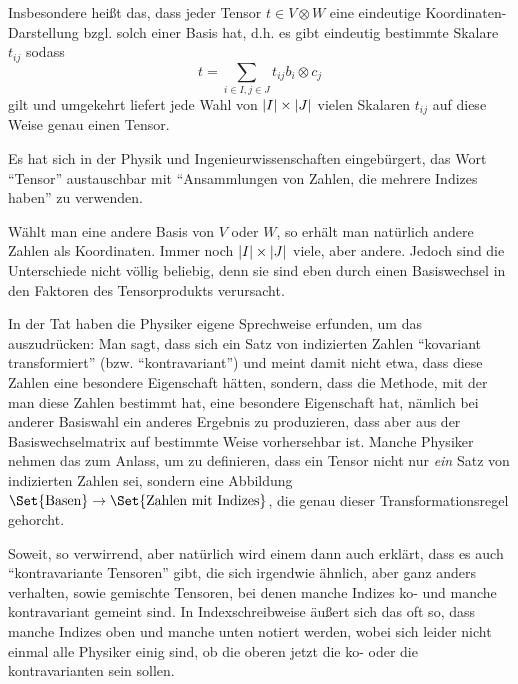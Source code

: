 \begin{remark}
Insbesondere heißt das, dass jeder Tensor $t\in V\otimes W$ eine eindeutige Koordinaten-Darstellung bzgl. solch einer Basis hat, d.h. es gibt eindeutig bestimmte Skalare $t_{ij}$ sodass
\[t = \sum_{i\in I, j\in J} t_{ij} b_i\otimes c_j\]
gilt und umgekehrt liefert jede Wahl von $\lvert I\rvert\times \lvert J\rvert$ vielen Skalaren $t_{ij}$ auf diese Weise genau einen Tensor.

Es hat sich in der Physik und Ingenieurwissenschaften eingebürgert, das Wort \enquote{Tensor} austauschbar mit \enquote{Ansammlungen von Zahlen, die mehrere Indizes haben} zu verwenden.

\medbreak
Wählt man eine andere Basis von $V$ oder $W$, so erhält man natürlich andere Zahlen als Koordinaten. Immer noch $\lvert I\rvert\times\lvert J\rvert$ viele, aber andere. Jedoch sind die Unterschiede nicht völlig beliebig, denn sie sind eben durch einen Basiswechsel in den Faktoren des Tensorprodukts verursacht.

In der Tat haben die Physiker eigene Sprechweise erfunden, um das auszudrücken: Man sagt, dass sich ein Satz von indizierten Zahlen \enquote{kovariant transformiert} (bzw. \enquote{kontravariant}) und meint damit nicht etwa, dass diese Zahlen eine besondere Eigenschaft hätten, sondern, dass die Methode, mit der man diese Zahlen bestimmt hat, eine besondere Eigenschaft hat, nämlich bei anderer Basiswahl ein anderes Ergebnis zu produzieren, dass aber aus der Basiswechselmatrix auf bestimmte Weise vorhersehbar ist. Manche Physiker nehmen das zum Anlass, um zu definieren, dass ein Tensor nicht nur \emph{ein} Satz von indizierten Zahlen sei, sondern eine Abbildung $\Set{\text{Basen}} \to \Set{\text{Zahlen mit Indizes}}$, die genau dieser Transformationsregel gehorcht.

\medbreak
Soweit, so verwirrend, aber natürlich wird einem dann auch erklärt, dass es auch \enquote{kontravariante Tensoren} gibt, die sich irgendwie ähnlich, aber ganz anders verhalten, sowie gemischte Tensoren, bei denen manche Indizes ko- und manche kontravariant gemeint sind. In Indexschreibweise äußert sich das oft so, dass manche Indizes oben und manche unten notiert werden, wobei sich leider nicht einmal alle Physiker einig sind, ob die oberen jetzt die ko- oder die kontravarianten sein sollen.
\end{remark}

